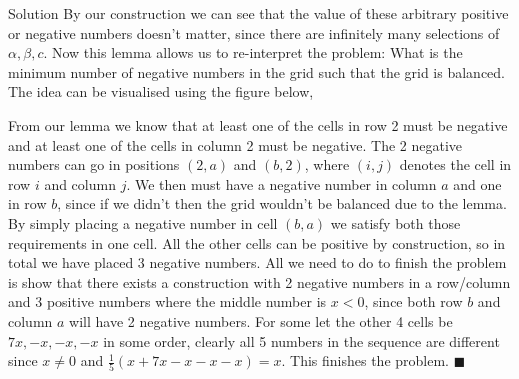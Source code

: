 \documentclass{article}
\begin{document}
\begin{solution}{Solution}
By our construction we can see that the value of these arbitrary positive
or negative numbers doesn't matter, since there are infinitely many
selections of $\alpha, \beta, c$. Now this lemma allows us to re-interpret
the problem: What is the minimum number of negative numbers in the grid
such that the grid is balanced. The idea can be visualised using the figure
below,

\begin{center}
\end{center}

From our lemma we know that at least one of the cells in row 2 must be
negative and at least one of the cells in column 2 must be negative. The
2 negative numbers can go in positions $(2, a)$ and $(b, 2)$, where
$(i, j)$ denotes the cell in row $i$ and column $j$. We then must have
a negative number in column $a$ and one in row $b$, since if we didn't
then the grid wouldn't be balanced due to the lemma. By simply placing a
negative number in cell $(b, a)$ we satisfy both those requirements in one
cell. All the other cells can be positive by construction, so in total we
have placed 3 negative numbers. All we need to
do to finish the problem is show that there exists a construction with
2 negative numbers in a row/column and 3 positive numbers where the middle
number is $x < 0$, since both row $b$ and column $a$ will have 2 negative
numbers. For some let the other 4 cells be $7x, -x, -x, -x$ in some order,
clearly all 5 numbers in the sequence are different since $x\neq 0$ and
$\frac{1}{5}(x+7x-x-x-x) = x$. This finishes the problem. $\blacksquare$
\end{solution}
\end{document}
